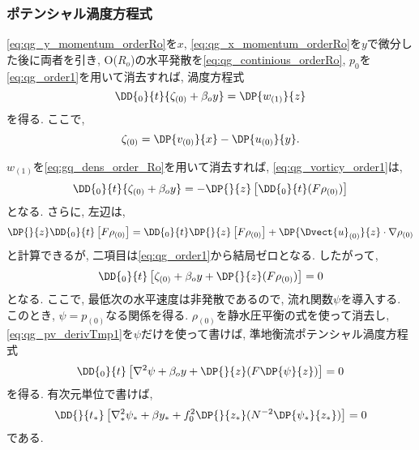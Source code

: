 \subsubsection*{ポテンシャル渦度方程式}
\eqref{eq:qg_y_momentum_orderRo}を$x$, \eqref{eq:qg_x_momentum_orderRo}を$y$で微分した後に両者を引き, 
O($R_o$)の水平発散を\eqref{eq:qg_continious_orderRo}, $p_0$を\eqref{eq:qg_order1}を用いて消去すれば, 
渦度方程式
\begin{equation} %
 \DD{_0}{t} \{ \zeta_{(0)} + \beta_o y \} = \DP{w_{(1)}}{z} 
\label{eq:qg_vorticy_order1}
\end{equation}
を得る. 
ここで, 
\begin{equation}
  \zeta_{(0)} = \DP{v_{(0)}}{x} - \DP{u_{(0)}}{y}. 
\end{equation}

$w_{(1)}$を\eqref{eq:gq_dens_order_Ro}を用いて消去すれば, 
\eqref{eq:qg_vorticy_order1}は, 
\begin{equation}
 \DD{_0}{t} \{ \zeta_{(0)} + \beta_o y \} = - \DP{}{z} \left[ \DD{_0}{t} (F\rho_{(0)}) \right]
\end{equation}
となる. 
さらに, 左辺は, 
$$
 \DP{}{z}\DD{_0}{t} \left[ F  \rho_{(0)} \right]
 = \DD{_0}{t} \DP{}{z}\left[ F  \rho_{(0)} \right] + \DP{\Dvect{u}_{(0)}}{z} \cdot \nabla \rho_{(0)}
$$
と計算できるが, 二項目は\eqref{eq:qg_order1}から結局ゼロとなる.  
したがって, 
\begin{equation}
 \DD{_0}{t} \left[ \zeta_{(0)} + \beta_o y + \DP{}{z}(F\rho_{(0)}) \right] = 0
\label{eq:qg_pv_derivTmp1}
\end{equation}
となる. 
ここで, 最低次の水平速度は非発散であるので, 流れ関数$\psi$を導入する. 
このとき, $\psi = p_{(0)}$なる関係を得る. 
$\rho_{(0)}$を静水圧平衡の式を使って消去し, 
\eqref{eq:qg_pv_derivTmp1}を$\psi$だけを使って書けば, 
準地衡流ポテンシャル渦度方程式
\begin{equation}
 \DD{_0}{t} \left[ \nabla^2 \psi + \beta_o y + \DP{}{z}(F \DP{\psi}{z}) \right] = 0  
\end{equation}
を得る. 
有次元単位で書けば, 
\begin{equation}
 \DD{}{t_*} \left[ \nabla_*^2 \psi_* + \beta y_* + f_0^2 \DP{}{z_*}( N^{-2} \DP{\psi_*}{z_*}) \right] = 0  
\end{equation}
である. 
